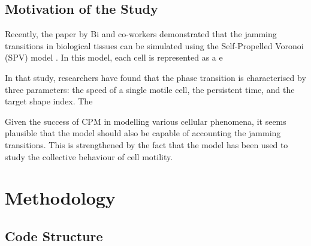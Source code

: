 \documentclass[a4paper,12pt]{article}
\begin{document}
\subsection{Motivation of the Study}
Recently, the paper by Bi and co-workers demonstrated that the jamming transitions in biological tissues can be simulated using the Self-Propelled Voronoi (SPV) model \cite{bimotility-driven2015}. In this model, each cell is represented as a e

In that study, researchers have found that the phase transition is characterised by three parameters: the speed of a single motile cell, the persistent time, and the target shape index. The

Given the success of CPM in modelling various cellular phenomena, it seems plausible that the model should also be capable of accounting the jamming transitions.  This is strengthened by the fact that the model has been used to study the collective behaviour of cell motility. 



\pagebreak
\section{Methodology}

\subsection{Code Structure}

%
%
\end{document}
